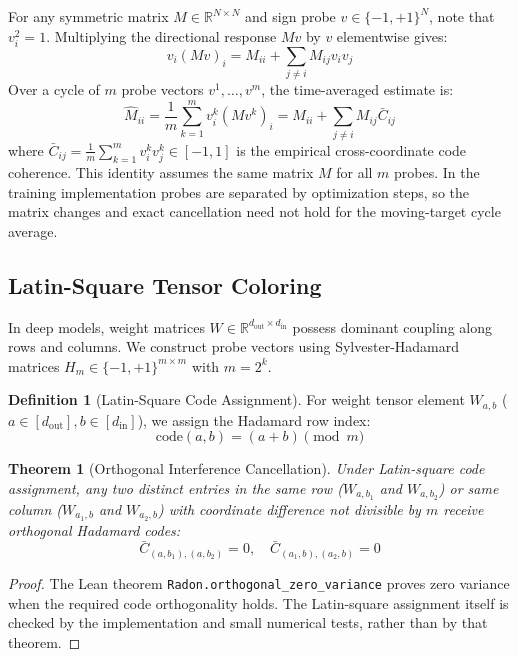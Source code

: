 \documentclass[11pt,a4paper]{article}
\newtheorem{theorem}{Theorem}
\theoremstyle{definition}
\newtheorem{definition}{Definition}
\theoremstyle{remark}
\begin{document}
For any symmetric matrix $M \in \mathbb{R}^{N \times N}$ and sign probe $v \in \{-1, +1\}^N$, note that $v_i^2 = 1$. Multiplying the directional response $Mv$ by $v$ elementwise gives:
\begin{equation}
v_i (M v)_i = M_{ii} + \sum_{j \neq i} M_{ij} v_i v_j
\end{equation}
Over a cycle of $m$ probe vectors $v^1, \dots, v^m$, the time-averaged estimate is:
\begin{equation}
\hat{M}_{ii} = \frac{1}{m} \sum_{k=1}^m v_i^k (M v^k)_i = M_{ii} + \sum_{j \neq i} M_{ij} \bar{C}_{ij}
\end{equation}
where $\bar{C}_{ij} = \frac{1}{m} \sum_{k=1}^m v_i^k v_j^k \in [-1, 1]$ is the empirical cross-coordinate code coherence.
This identity assumes the same matrix $M$ for all $m$ probes. In the training implementation probes are separated by optimization steps, so the matrix changes and exact cancellation need not hold for the moving-target cycle average.

\subsection{Latin-Square Tensor Coloring}

In deep models, weight matrices $W \in \mathbb{R}^{d_{\text{out}} \times d_{\text{in}}}$ possess dominant coupling along rows and columns. We construct probe vectors using Sylvester-Hadamard matrices $H_m \in \{-1, +1\}^{m \times m}$ with $m = 2^k$.
\begin{definition}[Latin-Square Code Assignment]
For weight tensor element $W_{a, b}$ ($a \in [d_{\text{out}}], b \in [d_{\text{in}}]$), we assign the Hadamard row index:
\begin{equation}
\mathrm{code}(a, b) = (a + b) \pmod m
\end{equation}
\end{definition}

\begin{theorem}[Orthogonal Interference Cancellation]
Under Latin-square code assignment, any two distinct entries in the same row ($W_{a, b_1}$ and $W_{a, b_2}$) or same column ($W_{a_1, b}$ and $W_{a_2, b}$) with coordinate difference not divisible by $m$ receive orthogonal Hadamard codes:
\begin{equation}
\bar{C}_{(a, b_1), (a, b_2)} = 0, \quad \bar{C}_{(a_1, b), (a_2, b)} = 0
\end{equation}
\end{theorem}
\begin{proof}
The Lean theorem \texttt{Radon.orthogonal\_zero\_variance} proves zero variance when the required code orthogonality holds. The Latin-square assignment itself is checked by the implementation and small numerical tests, rather than by that theorem.
\end{proof}
\end{document}
